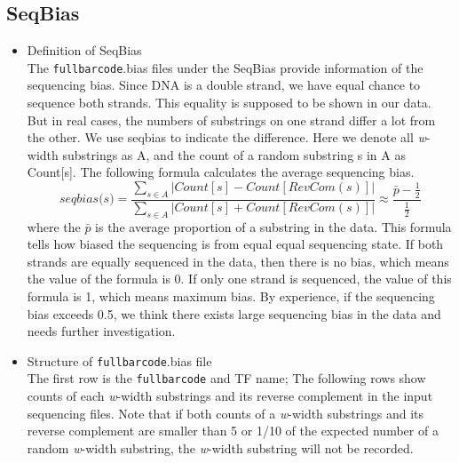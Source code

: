 \documentclass[a4paper,10pt]{article}
\begin{document}
\subsection{SeqBias}
\label{sec:seqbias}

\begin{itemize}
 \item Definition of SeqBias \\
  The \texttt{fullbarcode}.bias files under the SeqBias provide information of the sequencing bias.
  Since DNA is a double strand, we have equal chance to sequence both strands.
  This equality is supposed to be shown in our data. 
  But in real cases, the numbers of substrings on one strand differ a lot from the other. 
  We use seqbias to indicate the difference.
  Here we denote all \textit{w}-width substrings as A, and the count of a random substring s in A as Count[s].
  The following formula calculates the average sequencing bias.
  \begin{equation}
   \textit{seqbias(s)} = \frac{ \sum_{s \in A} \left| Count[s] - Count[RevCom(s)] \right| }{ \sum_{s \in A} \left| Count[s] + Count[RevCom(s)] \right| } 
                       \approx \frac{\bar{p}-\frac{1}{2}}{\frac{1}{2}}
  \end{equation}
  where the $\bar{p}$ is the average proportion of a substring in the data.
  This formula tells how biased the sequencing is from equal equal sequencing state.
  If both strands are equally sequenced in the data, then there is no bias, which means the value of the formula is 0.
  If only one strand is sequenced, the value of this formula is 1, which means maximum bias.
  By experience, if the sequencing bias exceeds 0.5, we think there exists large sequencing bias in the data and needs further investigation.

 \item Structure of \texttt{fullbarcode}.bias file \\
  The first row is the \texttt{fullbarcode} and TF name;
  The following rows show counts of each \textit{w}-width substrings and its reverse complement in the input sequencing files.
  Note that if both counts of a \textit{w}-width substrings and its reverse complement are smaller than 5 or 1/10 of the expected number of a random \textit{w}-width substring, the \textit{w}-width substring will not be recorded.
 
\end{itemize}
\end{document}
